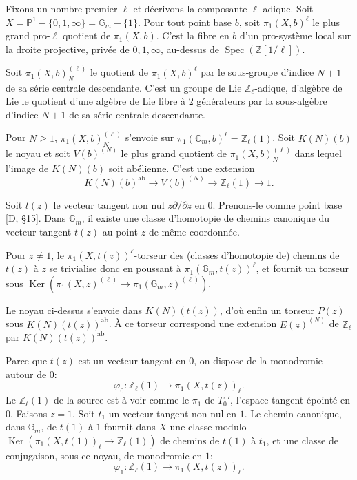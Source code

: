 \documentclass[12pt,a4paper]{article}
\theoremstyle{plain}
\theoremstyle{definition}
\theoremstyle{remark}
\DeclareMathOperator*{\Ker}{Ker}
\DeclareMathOperator{\Spec}{Spec}
\newcommand{\Z}{\mathbb{Z}}
\newcommand{\IP}{\mathbb{P}}
\newcommand{\Gm}{\mathbb{G}_m}
\newcommand{\ab}{\text{ab}}
\begin{document}
Fixons un nombre premier $\ell$ et d{\'e}crivons la composante $\ell$-adique. Soit $X=\IP^1-\{0,1,\infty\}=\Gm-\{1\}$. Pour tout point base $b$, soit $\pi_1(X,b)^\ell$ le plus grand pro-$\ell$ quotient de $\pi_1(X,b)$. C'est la fibre en $b$ d'un pro-syst{\`e}me local sur la droite projective, priv{\'e}e de $0,1,\infty$, au-dessus de $\Spec(\Z[1/\ell])$.

Soit $\pi_1(X,b)_N^{(\ell)}$ le quotient de $\pi_1(X,b)^\ell$ par le sous-groupe d'indice $N+1$ de sa s{\'e}rie centrale descendante. C'est un groupe de Lie $\Z_\ell$-adique, d'alg{\`e}bre de Lie le quotient d'une alg{\`e}bre de Lie libre {\`a} $2$ g{\'e}n{\'e}rateurs par la sous-alg{\`e}bre d'indice $N+1$ de sa s{\'e}rie centrale descendante.

Pour $N\geq 1$, $\pi_1(X,b)_N^{(\ell)}$ s'envoie sur $\pi_1(\Gm,b)^\ell=\Z_\ell(1)$. Soit $K(N)(b)$ le noyau et soit $V(b)^{(N)}$ le plus grand quotient de $\pi_1(X,b)_N^{(\ell)}$ dans lequel l'image de $K(N)(b)$ soit ab{\'e}lienne. C'est une extension
\begin{equation*}
K(N)(b)^{\ab} \to V(b)^{(N)} \to \Z_\ell(1) \to 1.
\end{equation*}

Soit $t(z)$ le vecteur tangent non nul $z\partial/\partial z$ en $0$. Prenons-le comme point base [D, \S 15]. Dans $\Gm$, il existe une classe d'homotopie de chemins canonique du vecteur tangent $t(z)$ au point $z$ de m{\^e}me coordonn{\'e}e.

Pour $z\neq 1$, le $\pi_1(X,t(z))^\ell$-torseur des (classes d'homotopie de) chemins de $t(z)$ {\`a} $z$ se trivialise donc en poussant {\`a} $\pi_1(\Gm,t(z))^\ell$, et fournit un torseur sous $\Ker(\pi_1(X,z)^{(\ell)}\to\pi_1(\Gm,z)^{(\ell)})$.

Le noyau ci-dessus s'envoie dans $K(N)(t(z))$, d'o{\`u} enfin un torseur $P(z)$ sous $K(N)(t(z))^{\ab}$. {\`A} ce torseur correspond une extension $E(z)^{(N)}$ de $\Z_\ell$ par $K(N)(t(z))^{\ab}$.

Parce que $t(z)$ est un vecteur tangent en $0$, on dispose de la monodromie autour de $0$:
\begin{equation*}
\varphi_0 : \Z_\ell(1) \longrightarrow \pi_1(X,t(z))_\ell.
\end{equation*}
Le $\Z_\ell(1)$ de la source est {\`a} voir comme le $\pi_1$ de $T_0'$, l'espace tangent {\'e}point{\'e} en $0$. Faisons $z=1$. Soit $t_1$ un vecteur tangent non nul en $1$. Le chemin canonique, dans $\Gm$, de $t(1)$ {\`a} $1$ fournit dans $X$ une classe modulo $\Ker(\pi_1(X,t(1))_\ell\to\Z_\ell(1))$ de chemins de $t(1)$ {\`a} $t_1$, et une classe de conjugaison, sous ce noyau, de monodromie en $1$:
\begin{equation*}
\varphi_1 : \Z_\ell(1) \longrightarrow \pi_1(X,t(z))_\ell.
\end{equation*}
\end{document}
